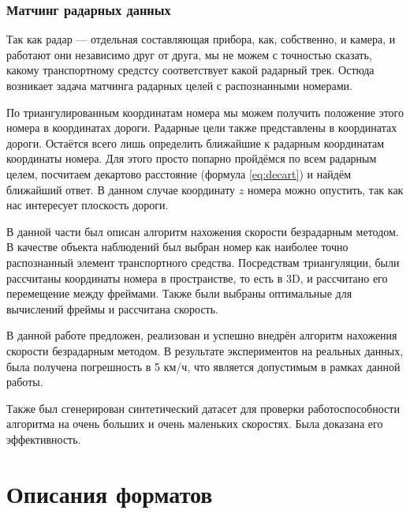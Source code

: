 \documentclass[specification,annotation,times]{itmo-student-thesis}
\begin{document}
	\subsection{Матчинг радарных данных}\label{sec:radar}
	Так как радар --- отдельная составляющая прибора, как, собственно, и камера, и работают они независимо друг от друга, мы не можем с точностью сказать, какому транспортному средстсу соответствует какой радарный трек. Остюда возникает задача матчинга радарных целей с распознанными номерами.
	
	По триангулированным координатам номера мы можем получить положение этого номера в координатах дороги. Радарные цели также представлены в координатах дороги.  Остаётся всего лишь определить ближайшие к радарным координатам координаты номера. Для этого просто попарно пройдёмся по всем радарным целем, посчитаем декартово расстояние (формула \ref{eq:decart}) и найдём ближайший ответ. В данном случае координату $ z $ номера можно опустить, так как нас интересует плоскость дороги.
	
	
	
	\chapterconclusion
	В данной части был описан алгоритм нахожения скорости безрадарным методом. В качестве объекта наблюдений был выбран номер как наиболее точно распознанный элемент транспортного средства. Посредствам триангуляции, были рассчитаны координаты номера в пространстве, то есть в 3D, и рассчитано его перемещение между фреймами. Также были выбраны оптимальные для вычислений фреймы и рассчитана скорость.
	
	\startconclusionpage
	В данной работе предложен, реализован и успешно внедрён алгоритм нахожения скорости безрадарным методом. В результате экспериментов на реальных данных, была получена погрешность в 5 км/ч, что является допустимым в рамках данной работы.
	
	Также был сгенерирован синтетический датасет для проверки работоспособности алгоритма на очень больших и очень маленьких скоростях. Была доказана его эффективность.
	
	\printmainbibliography
	
	\appendix
	
	\chapter{Описания форматов}\label{sec:app:1}
	
\end{document}
